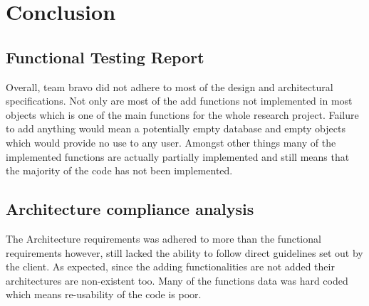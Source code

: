 \documentclass{article}
\begin{document}
\section{Conclusion}
\subsection{Functional Testing Report}
Overall, team bravo did not adhere to most of the design and architectural specifications. Not only are most of the add functions not implemented in most objects which is one of the main functions for the whole research project. Failure to add anything would mean a potentially empty database and empty objects which would provide no use to any user. Amongst other things many of the implemented functions are actually partially implemented and still means that the majority of the code has not been implemented.
\subsection{Architecture compliance analysis}
The Architecture requirements was adhered to more than the functional requirements however, still lacked the ability to follow direct guidelines set out by the client. As expected, since the adding functionalities are not added their architectures are non-existent too. Many of the functions data was hard coded which means re-usability of the code is poor. 
\end{document}
